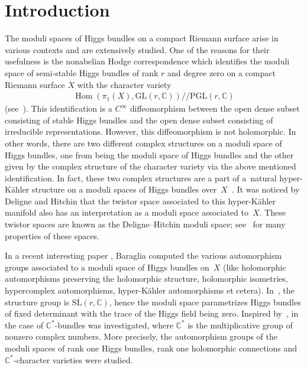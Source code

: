 \documentclass[pdftex]{sigma}
\numberwithin{equation}{section}
\begin{document}

\section{Introduction}

The moduli spaces of Higgs bundles on a compact Riemann surface arise in various contexts and are extensively studied. One of the reasons for their usefulness is the nonabelian Hodge correspondence which identif\/ies the moduli space of semi-stable Higgs bundles of rank $r$ and degree zero on a compact Riemann surface $X$ with the character
variety \begin{gather*}\operatorname{Hom}(\pi_1(X), \text{GL}(r,{\mathbb C}))/\!\!/ \text{PGL}(r,{\mathbb C})\end{gather*}
(see~\cite{Co, Do, H, Si}). This identif\/ication is a $C^\infty$ dif\/feomorphism between the open dense subset consisting of stable Higgs bundles and the open dense subset consisting of irreducible representations. However, this dif\/feomorphism is not holomorphic. In other words, there are two dif\/ferent complex structures on a moduli space of Higgs bundles, one from being the moduli space of Higgs bundles and the other given by the complex structure of the character variety via the above mentioned identif\/ication. In fact, these two complex structures are a part of a~natural hyper-K\"ahler structure on a moduli spaces of Higgs bundles over~$X$~\cite{H}. It was noticed by Deligne and Hitchin that the twistor space associated to this hyper-K\"ahler manifold also has an interpretation as a moduli space associated to~$X$. These twistor spaces are known as the Deligne--Hitchin moduli space; see~\cite{Si95, Si08} for many properties of these spaces.

In a recent interesting paper \cite{Ba}, Baraglia computed the various automorphism groups associated to a moduli space of Higgs bundles on~$X$ (like holomorphic automorphisms preserving the holomorphic structure, holomorphic isometries, hypercomplex automorphisms, hyper-K\"ahler automorphisms et cetera). In~\cite{Ba}, the structure group is $\text{SL}(r, {\mathbb C})$, hence the moduli space parametrizes Higgs bundles of f\/ixed determinant with the trace of the Higgs f\/ield being zero. Inspired by~\cite{Ba}, in \cite{BBS} the case of ${\mathbb C}^*$-bundles was investigated, where ${\mathbb C}^*$ is the multiplicative group of nonzero complex numbers. More precisely, the automorphism groups of the moduli spaces of rank one Higgs bundles, rank one holomorphic connections and ${\mathbb C}^*$-character varieties were studied.
\end{document}
